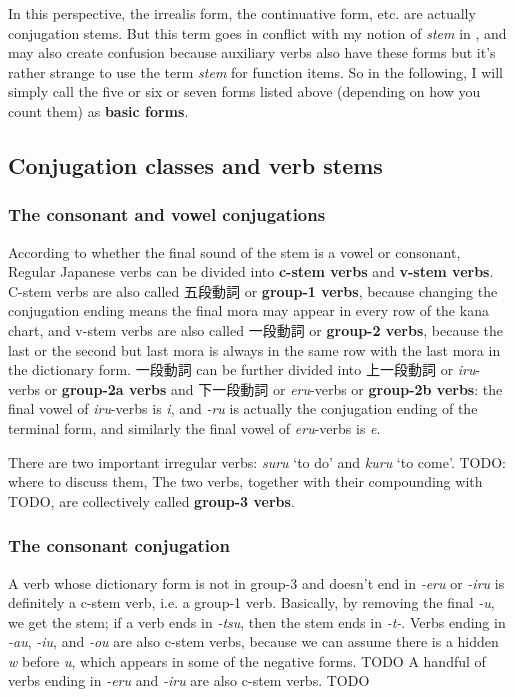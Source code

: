 \documentclass[UTF8, a4paper, oneside, scheme=plain]{ctexart}
\newcommand*{\concept}[1]{\textbf{#1}}
\newcommand*{\term}[1]{\emph{#1}}
\newcommand{\corpus}[1]{\emph{#1}}
\newcommand{\translate}[1]{`#1'}
\begin{document}
In this perspective, the irrealis form, the continuative form, etc. 
are actually conjugation stems.
But this term goes in conflict with my notion of \term{stem} in ,
and may also create confusion because auxiliary verbs also have these forms 
but it's rather strange to use the term \term{stem} for function items.
So in the following,
I will simply call the five or six or seven forms listed above (depending on how you count them)
as \concept{basic forms}.

\subsection{Conjugation classes and verb stems}\label{sec:conjugation-class}

\subsubsection{The consonant and vowel conjugations}

According to whether the final sound of the stem is a vowel or consonant,
Regular Japanese verbs can be divided into \concept{c-stem verbs} and \concept{v-stem verbs}.
C-stem verbs are also called 五段動詞 or \concept{group-1 verbs},
because changing the conjugation ending means the final mora may appear in every row of the kana chart, 
and v-stem verbs are also called 一段動詞 or \concept{group-2 verbs},
because the last or the second but last mora is always in the same row with the last mora in the dictionary form.
一段動詞 can be further divided into 上一段動詞 or \corpus{iru}-verbs or \concept{group-2a verbs} 
and 下一段動詞 or \corpus{eru}-verbs or \concept{group-2b verbs}:
the final vowel of \corpus{iru}-verbs is \corpus{i},
and \corpus{-ru} is actually the conjugation ending of the terminal form,
and similarly the final vowel of \corpus{eru}-verbs is \corpus{e}.

There are two important irregular verbs: \corpus{suru} \translate{to do} and \corpus{kuru} \translate{to come}.
TODO: where to discuss them, 
The two verbs, together with their compounding with TODO,
are collectively called \concept{group-3 verbs}.

\subsubsection{The consonant conjugation}

A verb whose dictionary form is not in group-3 and doesn't end in \corpus{-eru} or \corpus{-iru} 
is definitely a c-stem verb, i.e. a group-1 verb.
Basically, by removing the final \corpus{-u}, we get the stem;
if a verb ends in \corpus{-tsu},
then the stem ends in \corpus{-t-}.
Verbs ending in \corpus{-au}, \corpus{-iu}, and \corpus{-ou} are also c-stem verbs,
because we can assume there is a hidden \corpus{w} before \corpus{u},
which appears in some of the negative forms. TODO
A handful of verbs ending in \corpus{-eru} and \corpus{-iru} are also c-stem verbs. TODO
\end{document}
